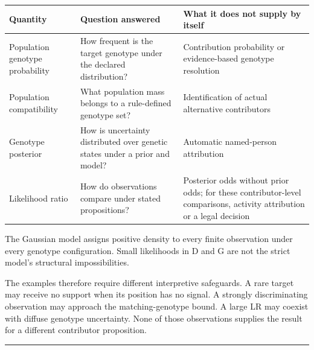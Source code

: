 \documentclass[
]{article}
\newcounter{none} %
\begin{document}
{\def\LTcaptype{none} %
\begin{longtable}[]{@{}
  >{\raggedright\arraybackslash}p{}
  >{\raggedright\arraybackslash}p{}
  >{\raggedright\arraybackslash}p{}@{}}
\toprule\noalign{}
\begin{minipage}[b]{\linewidth}\raggedright
Quantity
\end{minipage} & \begin{minipage}[b]{\linewidth}\raggedright
Question answered
\end{minipage} & \begin{minipage}[b]{\linewidth}\raggedright
What it does not supply by itself
\end{minipage} \\
\midrule\noalign{}
\endhead
\bottomrule\noalign{}
\endlastfoot
Population genotype probability & How frequent is the target genotype
under the declared distribution? & Contribution probability or
evidence-based genotype resolution \\
Population compatibility & What population mass belongs to a
rule-defined genotype set? & Identification of actual alternative
contributors \\
Genotype posterior & How is uncertainty distributed over genetic states
under a prior and model? & Automatic named-person attribution \\
Likelihood ratio & How do observations compare under stated
propositions? & Posterior odds without prior odds; for these
contributor-level comparisons, activity attribution or a legal
decision \\
\end{longtable}
}

The Gaussian model assigns positive density to every finite observation
under every genotype configuration. Small likelihoods in D and G are not
the strict model's structural impossibilities.

The examples therefore require different interpretive safeguards. A rare
target may receive no support when its position has no signal. A
strongly discriminating observation may approach the matching-genotype
bound. A large LR may coexist with diffuse genotype uncertainty. None of
those observations supplies the result for a different contributor
proposition.

\begin{center}\rule{0.5\linewidth}{0.5pt}\end{center}
\end{document}
